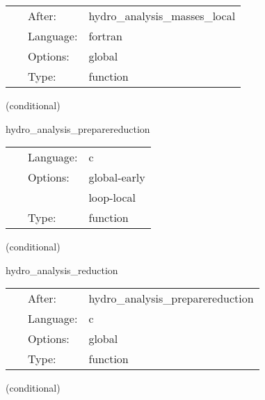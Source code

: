  \begin{tabular*}{160mm}{cll} 
~ & After:  & hydro\_analysis\_masses\_local \\ 
~ & Language:  & fortran \\ 
~ & Options:  & global \\ 
~ & Type:  & function \\ 
\end{tabular*} 


\vspace{5mm}

   (conditional) 

\hspace{5mm} hydro\_analysis\_preparereduction 

\hspace{5mm}{\it compute the local reduction results } 


\hspace{5mm}

 \begin{tabular*}{160mm}{cll} 
~ & Language:  & c \\ 
~ & Options:  & global-early \\ 
~& ~ &loop-local\\ 
~ & Type:  & function \\ 
\end{tabular*} 


\vspace{5mm}

   (conditional) 

\hspace{5mm} hydro\_analysis\_reduction 

\hspace{5mm}{\it compute the global reduction results } 


\hspace{5mm}

 \begin{tabular*}{160mm}{cll} 
~ & After:  & hydro\_analysis\_preparereduction \\ 
~ & Language:  & c \\ 
~ & Options:  & global \\ 
~ & Type:  & function \\ 
\end{tabular*} 


\vspace{5mm}

   (conditional) 

